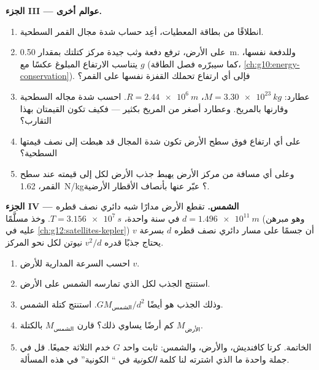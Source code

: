 \begin{problem}
\medskip
\noindent\textbf{الجزء III --- عوالم أخرى.}
\begin{enumerate}[resume]
  \item انطلاقًا من بطاقة المعطيات، أعِد حساب شدة مجال القمر
        السطحية.
  \item على الأرض، ترفع دفعة وثب جيدة مركز كتلتك بمقدار
        \qty{0.50}{m}. وللدفعة نفسها، يتناسب الارتفاع المبلوغ عكسًا
        مع $g$ (كما سيبرّره فصل الطاقة،
        \cref{ch:g10:energy-conservation}). فإلى أي ارتفاع تحملك
        القفزة نفسها على القمر؟
  \item عطارد: $M = \qty{3.30e23}{kg}$، $R = \qty{2.44e6}{m}$.
        احسب شدة مجاله السطحية وقارنها بالمريخ.
        وعطارد أصغر من المريخ بكثير --- فكيف تكون القيمتان
        بهذا التقارب؟
  \item على أي ارتفاع فوق سطح الأرض تكون شدة
        المجال قد هبطت إلى نصف قيمتها السطحية؟
  \item وعلى أي مسافة من مركز الأرض يهبط جذب الأرض
        لكل  إلى قيمته عند سطح القمر،
        \qty{1.62}{N/kg}؟ عبّر عنها بأنصاف الأقطار الأرضية.
\end{enumerate}

\medskip
\noindent\textbf{الجزء IV ---  الشمس.}
تقطع الأرض مدارًا شبه دائري نصف قطره
$d = \qty{1.496e11}{m}$ في سنة واحدة، $T = \qty{3.156e7}{s}$. وخذ
مسلَّمًا (وهو مبرهن عليه في \cref{ch:g12:satellites-kepler}) أن جسمًا على
مسار دائري نصف قطره $d$ بسرعة $v$ يحتاج جذبًا قدره $v^2/d$
نيوتن لكل  نحو المركز.
\begin{enumerate}[resume]
  \item احسب السرعة المدارية للأرض $v$.
  \item استنتج الجذب لكل  الذي تمارسه الشمس على الأرض.
  \item وذلك الجذب هو أيضًا $G M_{\text{الشمس}} / d^2$. استنتج كتلة
        الشمس.
  \item كم أرضًا يساوي ذلك؟ قارن $M_{\text{الشمس}}$ بالكتلة
        $M_{\text{الأرض}}$.
  \item الخاتمة. كرتا كافنديش، والأرض، والشمس: ثابت واحد
        $G$ خدم الثلاثة جميعًا. قل في جملة واحدة ما الذي اشترته لنا
        كلمة \emph{الكونية} في `` الكونية'' في
        هذه المسألة.
\end{enumerate}
\end{problem}

